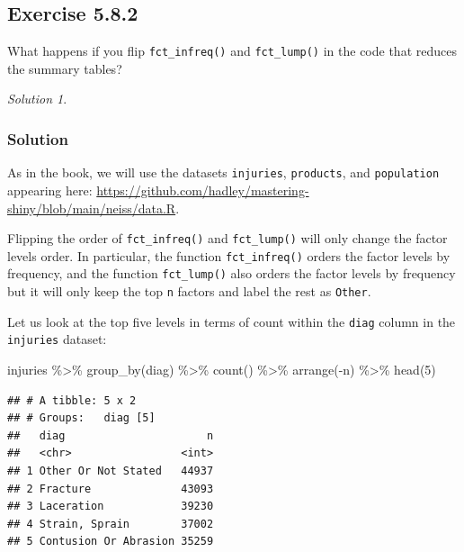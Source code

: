\documentclass[
]{book}
\newenvironment{Shaded}{\begin{snugshade}}{\end{snugshade}}
\newcommand{\DecValTok}[1]{\textcolor[rgb]{0.00,0.00,0.81}{#1}}
\newcommand{\FunctionTok}[1]{\textcolor[rgb]{0.00,0.00,0.00}{#1}}
\newcommand{\NormalTok}[1]{#1}
\newcommand{\SpecialCharTok}[1]{\textcolor[rgb]{0.00,0.00,0.00}{#1}}
\theoremstyle{definition}
\theoremstyle{definition}
\theoremstyle{definition}
\theoremstyle{definition}
\theoremstyle{remark}
\newtheorem*{solution}{Solution}
\begin{document}
\hypertarget{exercise-5.8.2}{%
\subsection*{Exercise 5.8.2}\label{exercise-5.8.2}}

What happens if you flip \texttt{fct\_infreq()} and \texttt{fct\_lump()} in the code that
reduces the summary tables?

\begin{solution}
\leavevmode

\hypertarget{solution-19}{%
\subsubsection*{Solution}\label{solution-19}}

As in the book, we will use the datasets \texttt{injuries}, \texttt{products}, and
\texttt{population} appearing here:
\url{https://github.com/hadley/mastering-shiny/blob/main/neiss/data.R}.

Flipping the order of \texttt{fct\_infreq()} and \texttt{fct\_lump()} will only change the
factor levels order. In particular, the function \texttt{fct\_infreq()} orders the
factor levels by frequency, and the function \texttt{fct\_lump()} also orders the
factor levels by frequency but it will only keep the top \texttt{n} factors and label
the rest as \texttt{Other}.

Let us look at the top five levels in terms of count within the \texttt{diag} column
in the \texttt{injuries} dataset:

\begin{Shaded}
\begin{Highlighting}[]
\NormalTok{injuries }\SpecialCharTok{\%\textgreater{}\%}
  \FunctionTok{group\_by}\NormalTok{(diag) }\SpecialCharTok{\%\textgreater{}\%}
  \FunctionTok{count}\NormalTok{() }\SpecialCharTok{\%\textgreater{}\%}
  \FunctionTok{arrange}\NormalTok{(}\SpecialCharTok{{-}}\NormalTok{n) }\SpecialCharTok{\%\textgreater{}\%}
  \FunctionTok{head}\NormalTok{(}\DecValTok{5}\NormalTok{)}
\end{Highlighting}
\end{Shaded}

\begin{verbatim}
## # A tibble: 5 x 2
## # Groups:   diag [5]
##   diag                      n
##   <chr>                 <int>
## 1 Other Or Not Stated   44937
## 2 Fracture              43093
## 3 Laceration            39230
## 4 Strain, Sprain        37002
## 5 Contusion Or Abrasion 35259
\end{verbatim}


\end{solution}
\end{document}
